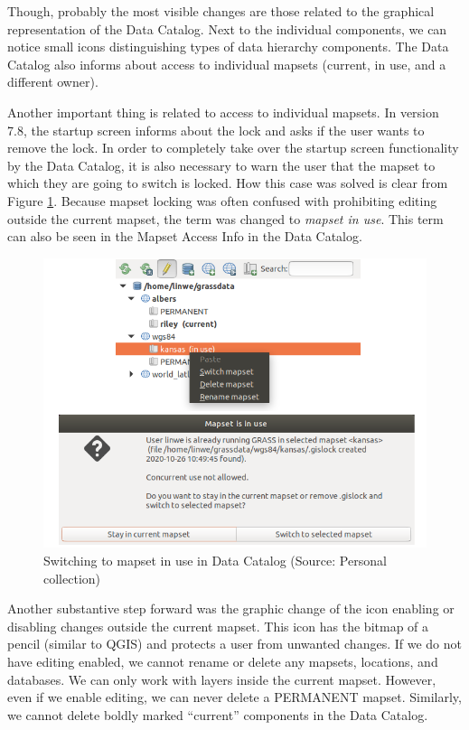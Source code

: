 \documentclass[a4paper,10pt,twoside]{article}
\begin{document}
\newpage Though, probably the most visible changes are those related to the graphical representation of the Data Catalog. Next to the individual components, we can notice small icons distinguishing types of data hierarchy components. The Data Catalog also informs about access to individual mapsets (current, in use, and a different owner).

Another important thing is related to access to individual mapsets. In version 7.8, the startup screen informs about the lock and asks if the user wants to remove the lock.
In order to completely take over the startup screen functionality by the Data Catalog, it is also necessary to warn the user that the mapset to which they are going to switch is locked. How this case was solved is clear from Figure \ref{fig:data_catalog_switch_new}. Because mapset locking was often confused with prohibiting editing outside the current mapset, the term was changed to \textit{mapset in use}. This term can also be seen in the Mapset Access Info in the Data Catalog.

\vspace{0.3cm}
\begin{figure}[hbt!] 
\begin{center}
\includegraphics[width=13cm]{../pictures/data_catalog_switch.png} 
\caption[Switching to mapset in use in Data Catalog]{Switching to mapset in use in Data Catalog (Source: Personal collection)}
\label{fig:data_catalog_switch_new}
\end{center}
\end{figure}

\noindent Another substantive step forward was the graphic change of the icon enabling or disabling changes outside the current mapset. This icon has the bitmap of a pencil (similar to QGIS) and protects a user from unwanted changes. If we do not have editing enabled, we cannot rename or delete any mapsets, locations, and databases. We can only work with layers inside the current mapset. However, even if we enable editing, we can never delete a PERMANENT mapset. Similarly, we cannot delete boldly marked ``current” components in the Data Catalog.
\end{document}
